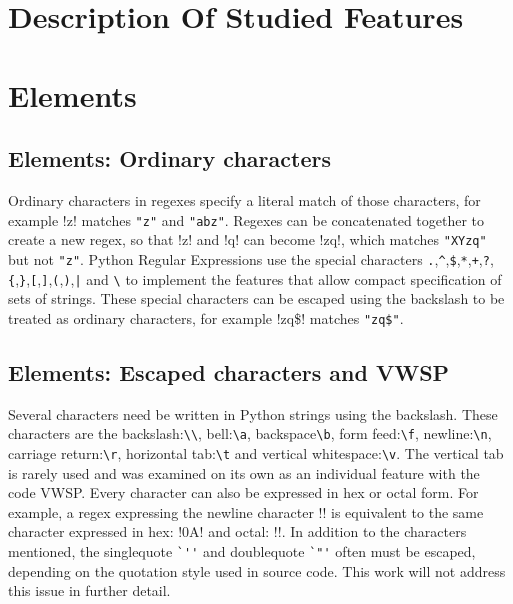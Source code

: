 \section{Description Of Studied Features}
\label{sec:featureDescriptions}

\section*{Elements}

\subsection*{Elements: Ordinary characters}

Ordinary characters in regexes specify a literal match of those characters, for example \cverb!z! matches \verb!"z"! and \verb!"abz"!.  Regexes can be concatenated together to create a new regex, so that \cverb!z! and \cverb!q! can become \cverb!zq!, which matches \verb!"XYzq"! but not \verb!"z"!.  Python Regular Expressions use the special characters \verb!.!,\verb!^!,\verb!$!,\verb!*!,\verb!+!,\verb!?!,\verb!{!,\verb!}!,\verb![!,\verb!]!,\verb!(!,\verb!)!,\verb!|! and \verb!\! to implement the features that allow compact specification of sets of strings.  These special characters can be escaped using the backslash to be treated as ordinary characters, for example \cverb!zq\$! matches \verb!"zq$"!.

\subsection*{Elements: Escaped characters and VWSP}

Several characters need be written in Python strings using the backslash.  These characters are the backslash:\verb!\\!, bell:\verb!\a!, backspace\verb!\b!, form feed:\verb!\f!, newline:\verb!\n!, carriage return:\verb!\r!, horizontal tab:\verb!\t! and vertical whitespace:\verb!\v!.  The vertical tab is rarely used and was examined on its own as an individual feature with the code VWSP.  Every character can also be expressed in hex or octal form.  For example, a regex expressing the newline character \cverb!\n! is equivalent to the same character expressed in hex: \cverb!\x0A! and octal: \cverb!!.  In addition to the characters mentioned, the singlequote \verb!`''! and doublequote \verb!`"'! often must be escaped, depending on the quotation style used in source code.  This work will not address this issue in further detail.

